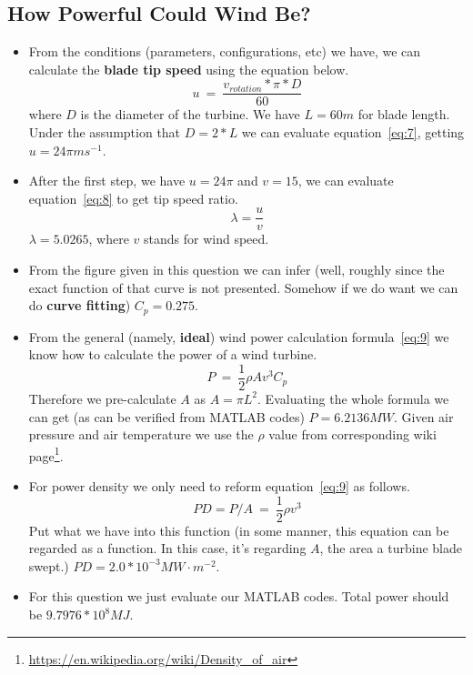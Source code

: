\documentclass[12pt]{article}
\begin{document}
\subsection{How Powerful Could Wind Be?}
\label{sec:how-powerful-could}

\begin{itemize}
\item From the conditions (parameters, configurations, etc) we have,
  we can calculate the \textbf{blade tip speed} using the equation
  below.
  \begin{equation}
    \label{eq:7}
    u~=~\frac{v_{rotation}*\pi*D}{60}
  \end{equation}
  where $D$ is the diameter of the turbine. We have $L=60m$ for blade
  length. Under the assumption that $D=2*L$ we can evaluate
  equation~\eqref{eq:7}, getting $u=24\pi ms^{-1}$.
\item After the first step, we have $u=24\pi$ and $v=15$, we can
  evaluate equation~\eqref{eq:8} to get tip speed ratio.
  \begin{equation}
    \label{eq:8}
    \lambda=\frac{u}{v}
  \end{equation}
  $\lambda=5.0265$, where $v$ stands for wind speed.
\item From the figure given in this question we can infer (well,
  roughly since the exact function of that curve is not
  presented. Somehow if we do want we can do \textbf{curve fitting})
  $C_{p}=0.275$.
\item From the general (namely, \textbf{ideal}) wind power calculation
  formula~\eqref{eq:9} we know how to calculate the power of a wind
  turbine.
  \begin{equation}
    \label{eq:9}
    P~=~\frac{1}{2}\rho Av^{3}C_{p}
  \end{equation}
  Therefore we pre-calculate $A$ as $A=\pi L^{2}$. Evaluating the
  whole formula we can get (as can be verified from MATLAB codes)
  $P=6.2136MW$. Given air pressure and air temperature we use the
  $\rho$ value from corresponding wiki
  page\footnote{\url{https://en.wikipedia.org/wiki/Density_of_air}}. 
\item For power density we only need to reform equation~\eqref{eq:9}
  as follows.
  \begin{equation}
    \label{eq:10}
    PD=P/A~=~\frac{1}{2}\rho v^{3}
  \end{equation}
  Put what we have into this function (in some manner, this equation
  can be regarded as a function. In this case, it's regarding $A$, the
  area a turbine blade swept.) $PD=2.0*10^{-3}MW\cdot m^{-2}$.
\item For this question we just evaluate our MATLAB codes. Total power
  should be $9.7976*10^{8}MJ$.
\end{itemize}
\end{document}
